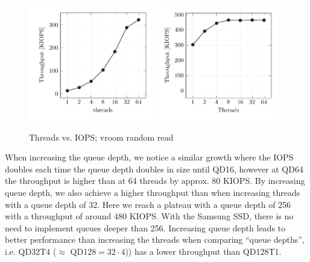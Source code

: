 \begin{figure}[H]
  \centering
   {\includegraphics[width=0.48\textwidth]{figures/vroom-iops-thread} \label{fig:vroom-iops-thread-qd1}}
   {\includegraphics[width=0.48\textwidth]{figures/vroom-iops-thread-qd32} \label{fig:vroom-iops-thread-qd32}}
  \caption{Threads vs. IOPS; vroom random read}
  \label{fig:vroom-iops-thread}
\end{figure}

When increasing the queue depth, we notice a similar growth where the IOPS doubles each time the queue depth doubles in size until QD16, however at QD64 the throughput is higher than at 64 threads by approx. 80 KIOPS. By increasing queue depth, we also achieve a higher throughput than when increasing threads with a queue depth of 32. Here we reach a plateau with a queue depth of 256 with a throughput of around 480 KIOPS. With the Samsung SSD, there is no need to implement queues deeper than 256. Increasing queue depth leads to better performance than increasing the threads when comparing ``queue depths'', i.e. QD32T4 ($\approx$ QD128$=32 \cdot 4$)) has a lower throughput than QD128T1.

